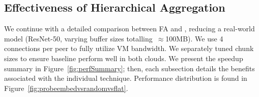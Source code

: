 \subsection{Effectiveness of Hierarchical Aggregation}
\label{sec:2lhaRandom} 
We continue with a detailed comparison between \plink FA and \mlha, reducing a real-world model (ResNet-50, varying buffer sizes totalling~$\approx$100MB). We use 4 connections per peer to fully utilize VM bandwidth. We separately tuned chunk sizes to ensure baseline perform well in both clouds. We present the speedup summary in Figure~\ref{fig:perfSummary}; then, each subsection details the benefits associated with the individual technique. Performance distribution is found in Figure~\ref{fig:probeembedvsrandomvsflat}.  %




